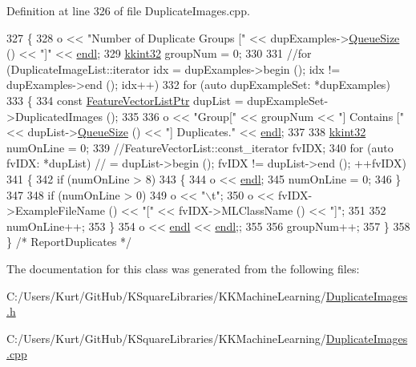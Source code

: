 Definition at line 326 of file Duplicate\+Images.\+cpp.


\begin{DoxyCode}
327 \{
328   o << \textcolor{stringliteral}{"Number of Duplicate Groups ["} << dupExamples->\hyperlink{class_k_k_b_1_1_k_k_queue_a1dab601f75ee6a65d97f02bddf71c40d}{QueueSize} () << \textcolor{stringliteral}{"]"} << 
      \hyperlink{namespace_k_k_b_ad1f50f65af6adc8fa9e6f62d007818a8}{endl};
329   \hyperlink{namespace_k_k_b_a8fa4952cc84fda1de4bec1fbdd8d5b1b}{kkint32}  groupNum = 0;
330 
331   \textcolor{comment}{//for  (DuplicateImageList::iterator  idx = dupExamples->begin ();  idx != dupExamples->end ();  idx++)}
332   \textcolor{keywordflow}{for}  (\textcolor{keyword}{auto}  dupExampleSet:  *dupExamples)
333   \{
334     \textcolor{keyword}{const} \hyperlink{class_k_k_m_l_l_1_1_feature_vector_list}{FeatureVectorListPtr}  dupList = dupExampleSet->DuplicatedImages ();
335 
336     o << \textcolor{stringliteral}{"Group["} << groupNum << \textcolor{stringliteral}{"] Contains ["} << dupList->\hyperlink{class_k_k_b_1_1_k_k_queue_a1dab601f75ee6a65d97f02bddf71c40d}{QueueSize} () << \textcolor{stringliteral}{"] Duplicates."} << 
      \hyperlink{namespace_k_k_b_ad1f50f65af6adc8fa9e6f62d007818a8}{endl};
337 
338     \hyperlink{namespace_k_k_b_a8fa4952cc84fda1de4bec1fbdd8d5b1b}{kkint32}  numOnLine = 0;
339     \textcolor{comment}{//FeatureVectorList::const\_iterator  fvIDX;}
340     \textcolor{keywordflow}{for}  (\textcolor{keyword}{auto} fvIDX: *dupList)   \textcolor{comment}{//  = dupList->begin ();  fvIDX != dupList->end ();  ++fvIDX)}
341     \{
342       \textcolor{keywordflow}{if}  (numOnLine > 8)
343       \{
344         o << \hyperlink{namespace_k_k_b_ad1f50f65af6adc8fa9e6f62d007818a8}{endl};
345         numOnLine = 0;
346       \}
347 
348       \textcolor{keywordflow}{if}  (numOnLine > 0)
349         o << \textcolor{stringliteral}{"\(\backslash\)t"};
350       o << fvIDX->ExampleFileName () << \textcolor{stringliteral}{"["} << fvIDX->MLClassName () << \textcolor{stringliteral}{"]"};
351 
352       numOnLine++;
353     \}
354     o << \hyperlink{namespace_k_k_b_ad1f50f65af6adc8fa9e6f62d007818a8}{endl} << \hyperlink{namespace_k_k_b_ad1f50f65af6adc8fa9e6f62d007818a8}{endl};;
355 
356     groupNum++;
357   \}
358 \}  \textcolor{comment}{/* ReportDuplicates */}
\end{DoxyCode}


The documentation for this class was generated from the following files\+:\begin{DoxyCompactItemize}
\item 
C\+:/\+Users/\+Kurt/\+Git\+Hub/\+K\+Square\+Libraries/\+K\+K\+Machine\+Learning/\hyperlink{_duplicate_images_8h}{Duplicate\+Images.\+h}\item 
C\+:/\+Users/\+Kurt/\+Git\+Hub/\+K\+Square\+Libraries/\+K\+K\+Machine\+Learning/\hyperlink{_duplicate_images_8cpp}{Duplicate\+Images.\+cpp}\end{DoxyCompactItemize}
